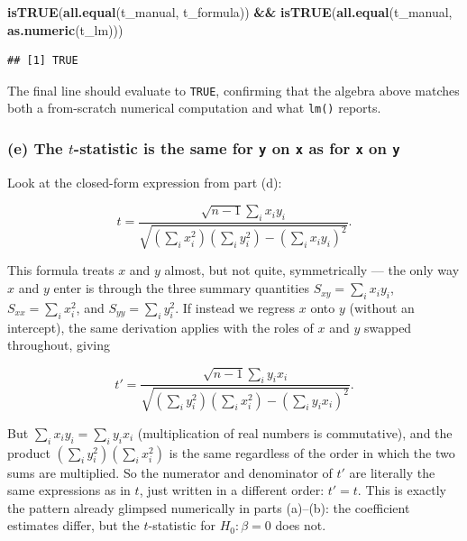 \documentclass[
  11pt,
]{article}
\newenvironment{Shaded}{\begin{snugshade}}{\end{snugshade}}
\newcommand{\FunctionTok}[1]{\textcolor[rgb]{0.13,0.29,0.53}{\textbf{#1}}}
\newcommand{\NormalTok}[1]{#1}
\newcommand{\SpecialCharTok}[1]{\textcolor[rgb]{0.81,0.36,0.00}{\textbf{#1}}}
\begin{document}
\begin{Shaded}
\begin{Highlighting}[]
\FunctionTok{isTRUE}\NormalTok{(}\FunctionTok{all.equal}\NormalTok{(t\_manual, t\_formula)) }\SpecialCharTok{\&\&}
  \FunctionTok{isTRUE}\NormalTok{(}\FunctionTok{all.equal}\NormalTok{(t\_manual, }\FunctionTok{as.numeric}\NormalTok{(t\_lm)))}
\end{Highlighting}
\end{Shaded}

\begin{verbatim}
## [1] TRUE
\end{verbatim}

The final line should evaluate to \texttt{TRUE}, confirming that the
algebra above matches both a from-scratch numerical computation and what
\texttt{lm()} reports.

\subsubsection{\texorpdfstring{(e) The \(t\)-statistic is the same for
\texttt{y} on \texttt{x} as for \texttt{x} on
\texttt{y}}{(e) The t-statistic is the same for y on x as for x on y}}\label{e-the-t-statistic-is-the-same-for-y-on-x-as-for-x-on-y}

Look at the closed-form expression from part (d):

\[
t = \frac{\sqrt{n-1}\sum_i x_i y_i}{\sqrt{\left(\sum_i x_i^2\right)\left(\sum_i y_i^2\right) - \left(\sum_i x_i y_i\right)^2}} .
\]

This formula treats \(x\) and \(y\) almost, but not quite, symmetrically
--- the only way \(x\) and \(y\) enter is through the three summary
quantities \(S_{xy} = \sum_i x_iy_i\), \(S_{xx} = \sum_i x_i^2\), and
\(S_{yy} = \sum_i
y_i^2\). If instead we regress \(x\) onto \(y\) (without an intercept),
the same derivation applies with the roles of \(x\) and \(y\) swapped
throughout, giving

\[
t' = \frac{\sqrt{n-1}\sum_i y_i x_i}{\sqrt{\left(\sum_i y_i^2\right)\left(\sum_i x_i^2\right) - \left(\sum_i y_ix_i\right)^2}} .
\]

But \(\sum_i x_iy_i = \sum_i y_ix_i\) (multiplication of real numbers is
commutative), and the product \(\left(\sum_i y_i^2\right)\left(\sum_i
x_i^2\right)\) is the same regardless of the order in which the two sums
are multiplied. So the numerator and denominator of \(t'\) are literally
the same expressions as in \(t\), just written in a different order:
\(t' = t\). This is exactly the pattern already glimpsed numerically in
parts (a)--(b): the coefficient estimates differ, but the
\(t\)-statistic for \(H_0 : \beta = 0\) does not.
\end{document}
